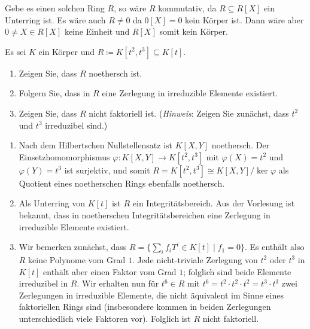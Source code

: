 \begin{solution}
  Gebe es einen solchen Ring $R$, so wäre $R$ kommutativ, da $R \subseteq R[X]$ ein Unterring ist.
  Es wäre auch $R \neq 0$ da $0[X] = 0$ kein Körper ist.
  Dann wäre aber $0 \neq X \in R[X]$ keine Einheit und $R[X]$ somit kein Körper.
\end{solution}


\begin{question}[subtitle = Ein nicht-faktorieller Ring]
  Es sei $K$ ein Körper und $R \coloneqq K[t^2, t^3] \subseteq K[t]$.
  \begin{enumerate}
    \item
      Zeigen Sie, dass $R$ noethersch ist.
    \item
      Folgern Sie, dass in $R$ eine Zerlegung in irreduzible Elemente existiert.
    \item
      Zeigen Sie, dass $R$ nicht faktoriell ist.
      (\emph{Hinweis}:
       Zeigen Sie zunächst, dass $t^2$ und $t^3$ irreduzibel sind.)
  \end{enumerate}
\end{question}


\begin{solution}
  \begin{enumerate}
    \item
      Nach dem Hilbertschen Nullstellensatz ist $K[X,Y]$ noethersch.
      Der Einsetzhomomorphismus $\varphi \colon K[X,Y] \to K[t^2, t^3]$ mit $\varphi(X) = t^2$ und $\varphi(Y) = t^3$ ist surjektiv, und somit $R = K[t^2, t^3] \cong K[X,Y]/\ker \varphi$ als Quotient eines noetherschen Rings ebenfalls noethersch.
    \item
      Als Unterring von $K[t]$ ist $R$ ein Integritätsbereich.
      Aus der Vorlesung ist bekannt, dass in noetherschen Integritätsbereichen eine Zerlegung in irreduzible Elemente existiert.
    \item
      Wir bemerken zunächst, dass $R = \{\sum_i f_i T^i \in K[t] \mid f_1 = 0\}$.
      Es enthält also $R$ keine Polynome vom Grad $1$.
      Jede nicht-triviale Zerlegung von $t^2$ oder $t^3$ in $K[t]$ enthält aber einen Faktor vom Grad $1$;
      folglich sind beide Elemente irreduzibel in $R$.
      Wir erhalten nun für $t^6 \in R$ mit $t^6 = t^2 \cdot t^2 \cdot t^2 = t^3 \cdot t^3$ zwei Zerlegungen in irreduzible Elemente, die nicht äquivalent im Sinne eines faktoriellen Rings sind (insbesondere kommen in beiden Zerlegungen unterschiedlich viele Faktoren vor).
      Folglich ist $R$ nicht faktoriell.
  \end{enumerate}
\end{solution}


